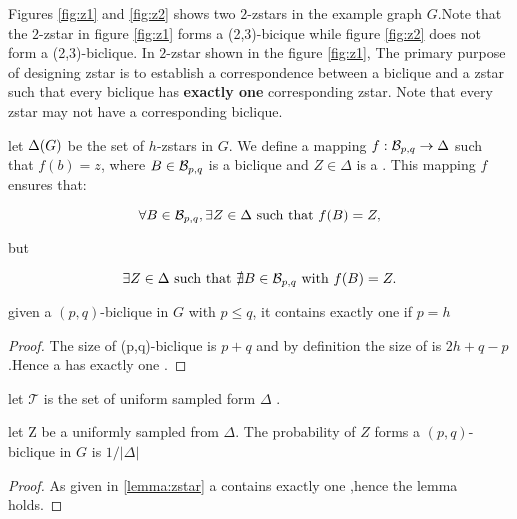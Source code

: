 

Figures \ref{fig:z1} and \ref{fig:z2} shows two $2$-zstars in the example graph $G$.Note that the $2$-zstar in figure \ref{fig:z1} forms a (2,3)-bicique while figure \ref{fig:z2} does not form a (2,3)-biclique. In $2$-zstar shown in the figure \ref{fig:z1}, The primary purpose of designing zstar is to establish a correspondence between a biclique and a zstar such that every biclique has \textbf{exactly one} corresponding zstar. Note that every zstar may not have a corresponding biclique.

%

 let $\Delta (G)$ be the set of $h$-zstars in $G$.  We define a mapping $f: \mathcal{B}_{p,q} \to \Delta$ such that $f(b) = z$, where $B \in \mathcal{B}_{p,q}$ is a biclique and $Z \in \Delta$ is a \zstar. This mapping $f$ ensures that:

$$
\forall B \in \mathcal{B}_{p,q}, \exists Z \in \Delta \text{ such that } f(B) = Z,
$$

but

$$
\exists Z \in \Delta \text{ such that } \nexists B \in \mathcal{B}_{p,q} \text{ with } f(B) = Z.
$$

\begin{lemma}
	\label{lemma:zstar}
	given a $(p,q)$-biclique in $G$ with $p \leq q$, it contains exactly one \zstar if $p = h$
\end{lemma}

\begin{proof}
	The size of (p,q)-biclique is $p+q$ and by definition the size of \zstar is $2h+q-p$ .Hence a \biclique has exactly one \zstar.
\end{proof}

let $\mathcal{T}$ is the set of uniform \zstars sampled form $\Delta$ .


\begin{lemma}
	\label{lemma:zstarprob}
	let Z be a \zstar uniformly sampled from $\Delta$. The probability of $Z$ forms a  $(p,q)$-biclique in $G$ is $1/|\Delta|$
\end{lemma}

\begin{proof}
	As given in \ref{lemma:zstar} a \biclique contains exactly one \zstar,hence the lemma holds.
\end{proof}

